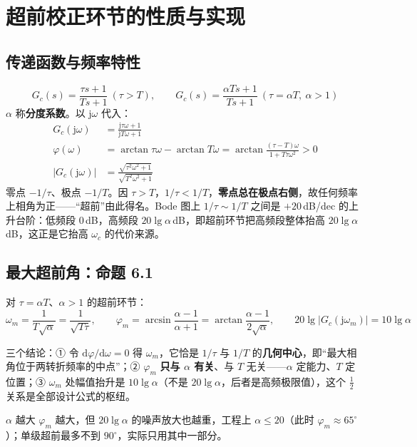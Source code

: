 \bigskip

\section{超前校正环节的性质与实现}

\subsection{传递函数与频率特性}
\[
G_c(s)=\frac{\tau s+1}{Ts+1}\ (\tau>T),\qquad
G_c(s)=\frac{\alpha Ts+1}{Ts+1}\ (\tau=\alpha T,\ \alpha>1)
\]
$\alpha$ 称\textbf{分度系数}。以 $\mathrm{j}\omega$ 代入：
\begin{align}
G_c(\mathrm{j}\omega)&=\frac{\mathrm{j}\tau\omega+1}{\mathrm{j}T\omega+1}\\
\varphi(\omega)&=\arctan\tau\omega-\arctan T\omega
=\arctan\frac{(\tau-T)\omega}{1+T\tau\omega^{2}}>0\\
\bigl|G_c(\mathrm{j}\omega)\bigr|&=\frac{\sqrt{\tau^{2}\omega^{2}+1}}{\sqrt{T^{2}\omega^{2}+1}}
\end{align}
零点 $-1/\tau$、极点 $-1/T$。因 $\tau>T$，$1/\tau<1/T$，\textbf{零点总在极点右侧}，故任何频率上相角为正——“超前”由此得名。Bode 图上 $1/\tau\sim1/T$ 之间是 $+20$\,dB/dec 的上升台阶：低频段 $0$\,dB，高频段 $20\lg\alpha$\,dB，即超前环节把高频段整体抬高 $20\lg\alpha$\,dB，这正是它抬高 $\omega_c$ 的代价来源。

\subsection{最大超前角：命题 6.1}
\begin{tcolorbox}[colback=blue!4,colframe=blue!45,title=\textbf{命题 6.1}]
对 $\tau=\alpha T$、$\alpha>1$ 的超前环节：
\[
\omega_m=\frac{1}{T\sqrt{\alpha}}=\frac{1}{\sqrt{T\tau}},\qquad
\varphi_m=\arcsin\frac{\alpha-1}{\alpha+1}=\arctan\frac{\alpha-1}{2\sqrt{\alpha}},\qquad
20\lg\bigl|G_c(\mathrm{j}\omega_m)\bigr|=10\lg\alpha
\]
\end{tcolorbox}
三个结论：① 令 $\mathrm{d}\varphi/\mathrm{d}\omega=0$ 得 $\omega_m$，它恰是 $1/\tau$ 与 $1/T$ 的\textbf{几何中心}，即“最大相角位于两转折频率的中点”；② $\varphi_m$ \textbf{只与 $\alpha$ 有关}、与 $T$ 无关——$\alpha$ 定能力、$T$ 定位置；③ $\omega_m$ 处幅值抬升是 $10\lg\alpha$（不是 $20\lg\alpha$，后者是高频极限值），这个 $\frac12$ 关系是全部设计公式的枢纽。

$\alpha$ 越大 $\varphi_m$ 越大，但 $20\lg\alpha$ 的噪声放大也越重，工程上 $\alpha\le20$（此时 $\varphi_m\approx65^\circ$）；单级超前最多不到 $90^\circ$，实际只用其中一部分。

